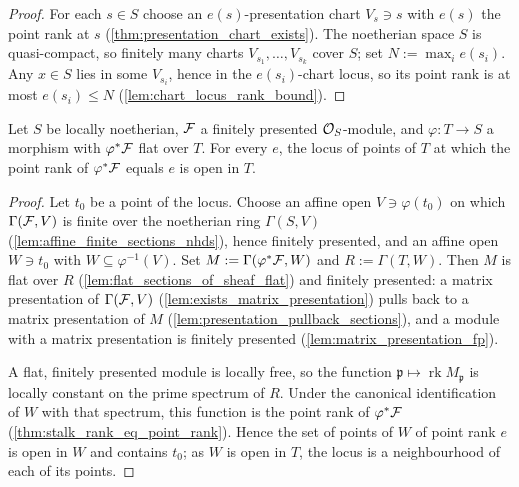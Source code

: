 \begin{proof}
  \leanok
  For each \(s \in S\) choose an \(e(s)\)-presentation chart \(V_s \ni s\)
  with \(e(s)\) the point rank at \(s\)
  (\cref{thm:presentation_chart_exists}).  The noetherian space \(S\) is
  quasi-compact, so finitely many charts \(V_{s_1}, \dots, V_{s_k}\) cover
  \(S\); set \(N := \max_i e(s_i)\).  Any \(x \in S\) lies in some
  \(V_{s_i}\), hence in the \(e(s_i)\)-chart locus, so its point rank is at
  most \(e(s_i) \le N\) (\cref{lem:chart_locus_rank_bound}).
\end{proof}

\begin{theorem}
  \label{thm:rank_fibers_open}
  \leanok
  Let \(S\) be locally noetherian, \(\mathcal{F}\) a finitely presented
  \(\mathcal{O}_S\)-module, and \(\varphi : T \to S\) a morphism with
  \(\varphi^*\mathcal{F}\) flat over \(T\).  For every \(e\), the locus of points of
  \(T\) at which the point rank of \(\varphi^*\mathcal{F}\) equals \(e\) is open in
  \(T\).
\end{theorem}

\begin{proof}
  \leanok
  Let \(t_0\) be a point of the locus.  Choose an affine open
  \(V \ni \varphi(t_0)\) on which \(\Gamma(\mathcal{F}, V)\) is finite over the
  noetherian ring \(\Gamma(S, V)\)
  (\cref{lem:affine_finite_sections_nhds}), hence finitely presented, and
  an affine open \(W \ni t_0\) with \(W \subseteq \varphi^{-1}(V)\).  Set
  \(M := \Gamma(\varphi^*\mathcal{F}, W)\) and \(R := \Gamma(T, W)\).  Then \(M\) is
  flat over \(R\) (\cref{lem:flat_sections_of_sheaf_flat}) and finitely
  presented: a matrix presentation of \(\Gamma(\mathcal{F}, V)\)
  (\cref{lem:exists_matrix_presentation}) pulls back to a matrix
  presentation of \(M\) (\cref{lem:presentation_pullback_sections}), and a
  module with a matrix presentation is finitely presented
  (\cref{lem:matrix_presentation_fp}).

  A flat, finitely presented module is locally free, so the function
  \(\mathfrak p \mapsto \operatorname{rk} M_{\mathfrak p}\) is locally
  constant on the prime spectrum of \(R\).  Under the canonical
  identification of \(W\) with that spectrum, this function is the point
  rank of \(\varphi^*\mathcal{F}\) (\cref{thm:stalk_rank_eq_point_rank}).  Hence the
  set of points of \(W\) of point rank \(e\) is open in \(W\) and contains
  \(t_0\); as \(W\) is open in \(T\), the locus is a neighbourhood of each
  of its points.
\end{proof}

